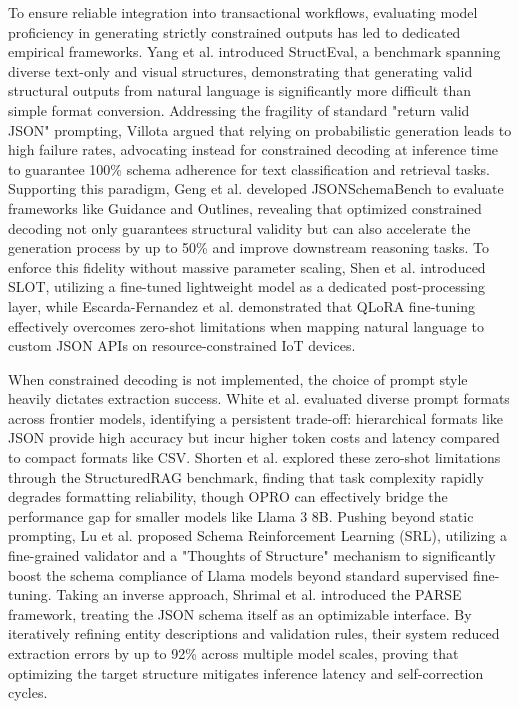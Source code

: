 \documentclass[journal,article,submit,pdftex,moreauthors]{Definitions/mdpi}
\begin{document}
To ensure reliable integration into transactional workflows, evaluating model proficiency in generating strictly constrained outputs has led to dedicated empirical frameworks. Yang et al. \cite{yang2025structeval} introduced StructEval, a benchmark spanning diverse text-only and visual structures, demonstrating that generating valid structural outputs from natural language is significantly more difficult than simple format conversion. Addressing the fragility of standard "return valid JSON" prompting, Villota \cite{villota2025structured} argued that relying on probabilistic generation leads to high failure rates, advocating instead for constrained decoding at inference time to guarantee 100\% schema adherence for text classification and retrieval tasks. Supporting this paradigm, Geng et al. \cite{geng2025jsonschemabenchrigorousbenchmarkstructured} developed JSONSchemaBench to evaluate frameworks like Guidance and Outlines, revealing that optimized constrained decoding not only guarantees structural validity but can also accelerate the generation process by up to 50\% and improve downstream reasoning tasks. To enforce this fidelity without massive parameter scaling, Shen et al. \cite{shen2025slot} introduced SLOT, utilizing a fine-tuned lightweight model as a dedicated post-processing layer, while Escarda-Fernandez et al. \cite{escarda2024llms} demonstrated that QLoRA fine-tuning effectively overcomes zero-shot limitations when mapping natural language to custom JSON APIs on resource-constrained IoT devices. 

When constrained decoding is not implemented, the choice of prompt style heavily dictates extraction success. White et al. \cite{white2025prompt} evaluated diverse prompt formats across frontier models, identifying a persistent trade-off: hierarchical formats like JSON provide high accuracy but incur higher token costs and latency compared to compact formats like CSV. Shorten et al. \cite{shorten2024structuredrag} explored these zero-shot limitations through the StructuredRAG benchmark, finding that task complexity rapidly degrades formatting reliability, though OPRO can effectively bridge the performance gap for smaller models like Llama 3 8B. Pushing beyond static prompting, Lu et al. \cite{lu2025learning} proposed Schema Reinforcement Learning (SRL), utilizing a fine-grained validator and a "Thoughts of Structure" mechanism to significantly boost the schema compliance of Llama models beyond standard supervised fine-tuning. Taking an inverse approach, Shrimal et al. \cite{shrimal2025parse} introduced the PARSE framework, treating the JSON schema itself as an optimizable interface. By iteratively refining entity descriptions and validation rules, their system reduced extraction errors by up to 92\% across multiple model scales, proving that optimizing the target structure mitigates inference latency and self-correction cycles.
\end{document}
